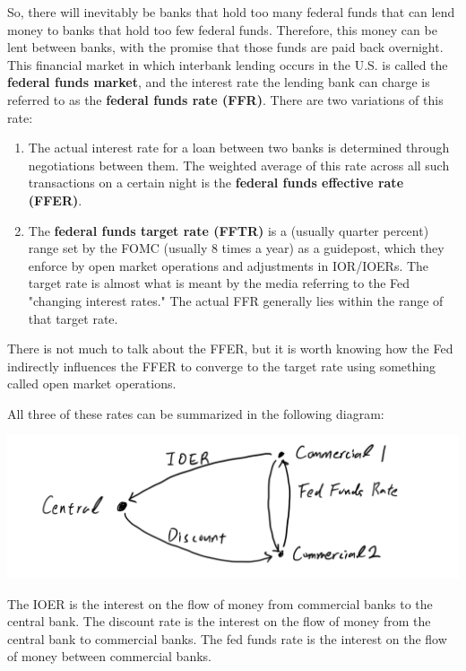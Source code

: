 \documentclass{article}
\begin{document}
      \begin{definition}
        So, there will inevitably be banks that hold too many federal funds that can lend money to banks that hold too few federal funds. Therefore, this money can be lent between banks, with the promise that those funds are paid back overnight. This financial market in which interbank lending occurs in the U.S. is called the \textbf{federal funds market}, and the interest rate the lending bank can charge is referred to as the \textbf{federal funds rate (FFR)}. There are two variations of this rate: 
        \begin{enumerate}
          \item The actual interest rate for a loan between two banks is determined through negotiations between them. The weighted average of this rate across all such transactions on a certain night is the \textbf{federal funds effective rate (FFER)}. 
          \item The \textbf{federal funds target rate (FFTR)} is a (usually quarter percent) range set by the FOMC (usually 8 times a year) as a guidepost, which they enforce by open market operations and adjustments in IOR/IOERs. The target rate is almost what is meant by the media referring to the Fed "changing interest rates." The actual FFR generally lies within the range of that target rate. 
        \end{enumerate}
        There is not much to talk about the FFER, but it is worth knowing how the Fed indirectly influences the FFER to converge to the target rate using something called open market operations.   
      \end{definition}

      All three of these rates can be summarized in the following diagram: 
      \begin{center}
        \includegraphics[scale=0.25]{img/Central_Commercial_Bank_Graph.PNG}
      \end{center}
      The IOER is the interest on the flow of money from commercial banks to the central bank. The discount rate is the interest on the flow of money from the central bank to commercial banks. The fed funds rate is the interest on the flow of money between commercial banks. 
\end{document}
